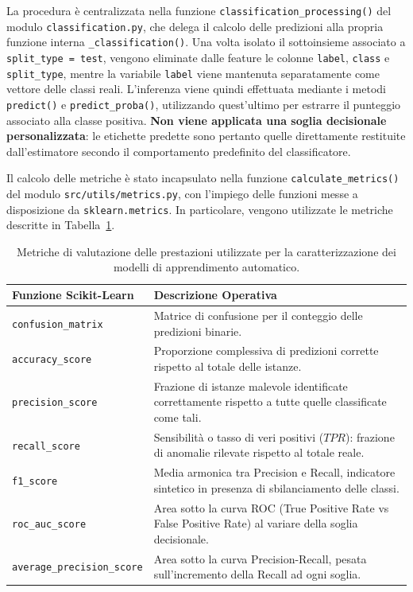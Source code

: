 La procedura è centralizzata nella funzione \texttt{classification\_processing()} del modulo \newline \texttt{classification.py}, che delega il calcolo delle predizioni alla propria funzione interna \newline \texttt{\_classification()}. 
Una volta isolato il sottoinsieme associato a \texttt{split\_type = test}, vengono eliminate dalle feature le colonne \texttt{label}, \texttt{class} e \texttt{split\_type}, mentre la variabile \texttt{label} viene mantenuta separatamente come vettore delle classi reali. 
L'inferenza viene quindi effettuata mediante i metodi \texttt{predict()} e \texttt{predict\_proba()}, utilizzando quest'ultimo per estrarre il punteggio associato alla classe positiva. 
\textbf{Non viene applicata una soglia decisionale personalizzata}: le etichette predette sono pertanto quelle direttamente restituite dall'estimatore secondo il comportamento predefinito del classificatore.

Il calcolo delle metriche è stato incapsulato nella funzione \texttt{calculate\_metrics()} del modulo \texttt{src/utils/metrics.py}, con l'impiego delle funzioni messe a disposizione da \texttt{sklearn.metrics}. 
In particolare, vengono utilizzate le metriche descritte in Tabella~\ref{tab:evaluation_metrics}.

\begin{table}[H]
    \centering
    \small
    \caption{Metriche di valutazione delle prestazioni utilizzate per la caratterizzazione dei modelli di apprendimento automatico.}
    \label{tab:evaluation_metrics}
    \begin{tabularx}{\textwidth}{l >{\raggedright\arraybackslash}X}
        \toprule
        \textbf{Funzione Scikit-Learn} & \textbf{Descrizione Operativa} \\
        \midrule
        \texttt{confusion\_matrix} & Matrice di confusione per il conteggio delle predizioni binarie. \\
        \texttt{accuracy\_score} & Proporzione complessiva di predizioni corrette rispetto al totale delle istanze. \\
        \texttt{precision\_score} & Frazione di istanze malevole identificate correttamente rispetto a tutte quelle classificate come tali. \\
        \texttt{recall\_score} & Sensibilità o tasso di veri positivi ($TPR$): frazione di anomalie rilevate rispetto al totale reale. \\
        \texttt{f1\_score} & Media armonica tra Precision e Recall, indicatore sintetico in presenza di sbilanciamento delle classi. \\
        \texttt{roc\_auc\_score} & Area sotto la curva ROC (True Positive Rate vs False Positive Rate) al variare della soglia decisionale. \\
        \texttt{average\_precision\_score} & Area sotto la curva Precision-Recall, pesata sull'incremento della Recall ad ogni soglia. \\
        \bottomrule
    \end{tabularx}
\end{table}

